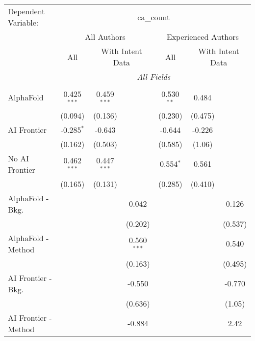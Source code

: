\begingroup
\centering
\begin{tabular}{lcccccc}
   \tabularnewline \midrule \midrule
   Dependent Variable: & \multicolumn{6}{c}{ca\_count}\\
 & \multicolumn{3}{c}{All Authors} & \multicolumn{3}{c}{Experienced Authors} \\
\cmidrule(lr){2-4} \cmidrule(lr){5-7}
 & \multicolumn{1}{c}{All} & \multicolumn{2}{c}{With Intent Data} & \multicolumn{1}{c}{All} & \multicolumn{2}{c}{With Intent Data} \\
\cmidrule(lr){2-2} \cmidrule(lr){3-4} \cmidrule(lr){5-5} \cmidrule(lr){6-7}
 & \multicolumn{6}{c}{\textit{All Fields}} \\ \\
   AlphaFold               & 0.425$^{***}$ & 0.459$^{***}$ &               & 0.530$^{**}$ & 0.484   &   \\   
                           & (0.094)       & (0.136)       &               & (0.230)      & (0.475) &   \\   
   AI Frontier             & -0.285$^{*}$  & -0.643        &               & -0.644       & -0.226  &   \\   
                           & (0.162)       & (0.503)       &               & (0.585)      & (1.06)  &   \\   
   No AI Frontier          & 0.462$^{***}$ & 0.447$^{***}$ &               & 0.554$^{*}$  & 0.561   &   \\   
                           & (0.165)       & (0.131)       &               & (0.285)      & (0.410) &   \\   
   AlphaFold - Bkg.        &               &               & 0.042         &              &         & 0.126\\   
                           &               &               & (0.202)       &              &         & (0.537)\\   
   AlphaFold - Method      &               &               & 0.560$^{***}$ &              &         & 0.540\\   
                           &               &               & (0.163)       &              &         & (0.495)\\   
   AI Frontier - Bkg.      &               &               & -0.550        &              &         & -0.770\\   
                           &               &               & (0.636)       &              &         & (1.05)\\   
   AI Frontier - Method    &               &               & -0.884        &              &         & 2.42\\   

\end{tabular}
